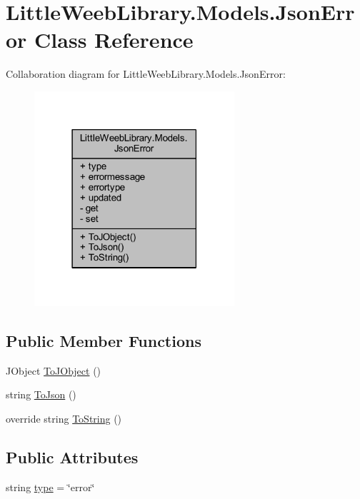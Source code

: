\hypertarget{class_little_weeb_library_1_1_models_1_1_json_error}{}\section{Little\+Weeb\+Library.\+Models.\+Json\+Error Class Reference}
\label{class_little_weeb_library_1_1_models_1_1_json_error}


Collaboration diagram for Little\+Weeb\+Library.\+Models.\+Json\+Error\+:\nopagebreak
\begin{figure}[H]
\begin{center}
\leavevmode
\includegraphics[width=210pt]{class_little_weeb_library_1_1_models_1_1_json_error__coll__graph}
\end{center}
\end{figure}
\subsection*{Public Member Functions}
\begin{DoxyCompactItemize}
\item 
J\+Object \mbox{\hyperlink{class_little_weeb_library_1_1_models_1_1_json_error_a0623b835bb68d5d5e1f591df6a09dd81}{To\+J\+Object}} ()
\item 
string \mbox{\hyperlink{class_little_weeb_library_1_1_models_1_1_json_error_a0e3e7dd2e2990404b7f0461742b23440}{To\+Json}} ()
\item 
override string \mbox{\hyperlink{class_little_weeb_library_1_1_models_1_1_json_error_ad7d5522c90119111d2e929f39e7f6d3c}{To\+String}} ()
\end{DoxyCompactItemize}
\subsection*{Public Attributes}
\begin{DoxyCompactItemize}
\item 
string \mbox{\hyperlink{class_little_weeb_library_1_1_models_1_1_json_error_a25ed286f6616ff3a708a5e2d1cbbc492}{type}} = \char`\"{}error\char`\"{}
\end{DoxyCompactItemize}

